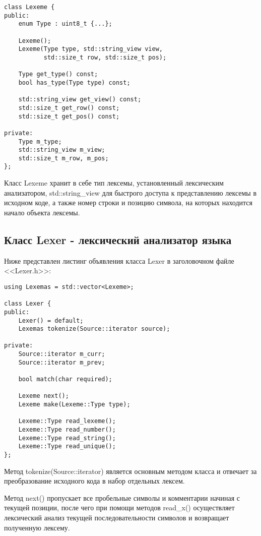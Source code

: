\begin{verbatim}
class Lexeme {
public:
    enum Type : uint8_t {...};

    Lexeme();
    Lexeme(Type type, std::string_view view, 
           std::size_t row, std::size_t pos);

    Type get_type() const;
    bool has_type(Type type) const;

    std::string_view get_view() const;
    std::size_t get_row() const;
    std::size_t get_pos() const;

private:
    Type m_type;
    std::string_view m_view;
    std::size_t m_row, m_pos;
};
\end{verbatim}

Класс Lexeme хранит в себе тип лексемы, установленный
лексическим анализатором, std::string\_view для
быстрого доступа к представлению лексемы 
в исходном коде, а также номер строки и позицию символа,
на которых находится начало объекта лексемы.

\subsection{Класс Lexer - лексический анализатор языка}

Ниже представлен листинг объявления класса Lexer
в заголовочном файле <<Lexer.h>>:

\begin{verbatim}
using Lexemas = std::vector<Lexeme>;

class Lexer {
public:
    Lexer() = default;
    Lexemas tokenize(Source::iterator source);

private:
    Source::iterator m_curr;
    Source::iterator m_prev;

    bool match(char required);

    Lexeme next();
    Lexeme make(Lexeme::Type type);

    Lexeme::Type read_lexeme();
    Lexeme::Type read_number();
    Lexeme::Type read_string();
    Lexeme::Type read_unique();
};
\end{verbatim}

Метод tokenize(Source::iterator) является основным методом
класса и отвечает за преобразование исходного кода в набор
отдельных лексем.

Метод next() пропускает все пробельные символы и комментарии
начиная с текущей позиции, после чего при помощи
методов read\_x() осуществляет 
лексический анализ текущей последовательности символов
и возвращает полученную лексему.

